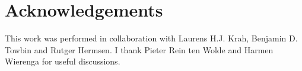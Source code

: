 %


\section{Acknowledgements}

This work was performed in collaboration with Laurens H.J. Krah, Benjamin D. Towbin and Rutger Hermsen.
%
I thank Pieter Rein ten Wolde and Harmen Wierenga for useful discussions.






